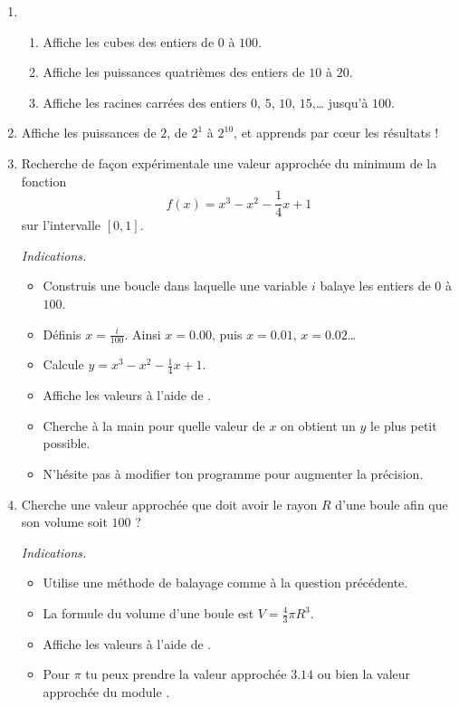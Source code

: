 \documentclass[11pt,class=report,crop=false]{standalone}
\begin{document}
\begin{activite}


\begin{enumerate}
  \item 
  \begin{enumerate}
    \item Affiche les cubes des entiers de $0$ à $100$.
    \item Affiche les puissances quatrièmes des entiers de $10$ à $20$.
    \item Affiche les racines carrées des entiers $0$, $5$, $10$, $15$,\ldots{} jusqu'à $100$.   
  \end{enumerate}

  \item Affiche les puissances de $2$, de $2^1$ à $2^{10}$, et apprends par c\oe ur les résultats !
  
  
  \item Recherche de façon expérimentale une valeur approchée du minimum de la fonction 
  $$f(x) = x^3-x^2-\frac14x+1$$
   sur l'intervalle $[0,1]$.
  
  \emph{Indications.}
  \begin{itemize}
    \item Construis une boucle dans laquelle une variable $i$ balaye les entiers de $0$ à $100$.
    \item Définis $x=\frac{i}{100}$. Ainsi $x=0.00$, puis $x=0.01$, $x=0.02$\ldots
    \item Calcule $y = x^3-x^2-\frac14x+1$.
    \item Affiche les valeurs à l'aide de .
    \item Cherche à la main pour quelle valeur de $x$ on obtient un $y$ le plus petit possible.
    \item N'hésite pas à modifier ton programme pour augmenter la précision.
  \end{itemize}
    
  \item  Cherche une valeur approchée que doit avoir
  le rayon $R$ d'une boule afin que son volume soit $100$ ?
  
  \emph{Indications.} 
  \begin{itemize}
    \item Utilise une méthode de balayage comme à la question précédente.
    \item La formule du volume d'une boule est $V = \frac43 \pi R^3$.
    \item Affiche les valeurs à l'aide de .    
    \item Pour $\pi$ tu peux prendre la valeur approchée $3.14$ ou bien la valeur approchée  du module .
  \end{itemize}
  
\end{enumerate}  
\end{activite}
\end{document}
